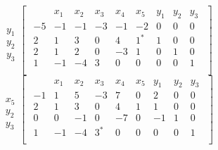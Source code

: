 \documentclass[12pt]{article}
\newenvironment{problem}[2][Problem]{\begin{trivlist}
\item[\hskip \labelsep {\bfseries #1}\hskip \labelsep {\bfseries #2.}]}{\end{trivlist}}
\theoremstyle{definition}
\begin{document}
\begin{problem}{4}
\begin{equation}
\begin{array}{c}
\\
  \\
y_1 \\
y_2 \\
y_3
\end{array}
\begin{bmatrix}
\begin{array}{c|cccccccc}
    & x_1 & x_2 & x_3 & x_4 & x_5 & y_1 & y_2 & y_3 \\ \hline
  -5 & -1 & -1 & -3 & -1 & -2 & 0 & 0 & 0 \\ \hline
  2 & 1 & 3 & 0 & 4 & 1^* & 1 & 0 & 0  \\
  2 & 1 & 2 & 0 & -3 & 1 & 0 & 1 & 0  \\
  1 & -1 & -4 & 3 & 0 & 0 & 0 & 0 & 1  \\
\end{array}
\end{bmatrix}
\end{equation}
$ $ \\

\begin{equation}
\begin{array}{c}
\\
  \\
x_5 \\
y_2 \\
y_3
\end{array}
\begin{bmatrix}
\begin{array}{c|cccccccc}
    & x_1 & x_2 & x_3 & x_4 & x_5 & y_1 & y_2 & y_3 \\ \hline
  -1 & 1 & 5 & -3 & 7 & 0 & 2 & 0 & 0 \\ \hline
  2 & 1 & 3 & 0 & 4 & 1 & 1 & 0 & 0  \\
  0 & 0 & -1 & 0 & -7 & 0 & -1 & 1 & 0  \\
  1 & -1 & -4 & 3^* & 0 & 0 & 0 & 0 & 1  \\
\end{array}
\end{bmatrix}
\end{equation}
$ $ \\


\end{problem}
\end{document}

